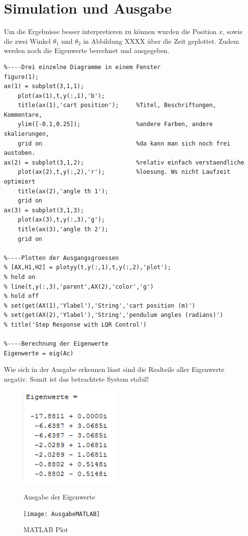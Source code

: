 \documentclass[a4paper, 10pt]{report}
\begin{document}
\section{Simulation und Ausgabe}
Um die Ergebnisse besser interpretieren zu können wurden die Position $x$, sowie die zwei Winkel $\theta_{1}$ und $\theta_{2}$ in Abbildung XXXX über die Zeit geplottet. Zudem werden noch die Eigenwerte berechnet und ausgegeben.  
\begin{lstlisting}
%----Drei einzelne Diagramme in einem Fenster
figure(1);
ax(1) = subplot(3,1,1);
    plot(ax(1),t,y(:,1),'b');
    title(ax(1),'cart position');     %Titel, Beschriftungen, Kommentare,
    ylim([-0.1,0.25]);                %andere Farben, andere skalierungen,
    grid on                           %da kann man sich noch frei austoben.
ax(2) = subplot(3,1,2);               %relativ einfach verstaendliche 
    plot(ax(2),t,y(:,2),'r');         %loesung. Ws nicht Laufzeit optimiert
    title(ax(2),'angle th 1');
    grid on
ax(3) = subplot(3,1,3);
    plot(ax(3),t,y(:,3),'g');
    title(ax(3),'angle th 2');
    grid on

%----Plotten der Ausgangsgroessen
% [AX,H1,H2] = plotyy(t,y(:,1),t,y(:,2),'plot');
% hold on
% line(t,y(:,3),'parent',AX(2),'color','g')
% hold off
% set(get(AX(1),'Ylabel'),'String','cart position (m)')
% set(get(AX(2),'Ylabel'),'String','pendulum angles (radians)')
% title('Step Response with LQR Control')

%----Berechnung der Eigenwerte
Eigenwerte = eig(Ac)
\end{lstlisting}
Wie sich in der Ausgabe erkennen lässt sind die Realteile aller Eigenwerte negativ. Somit ist das betrachtete System stabil!
\begin{figure}[h]
\centering  %
{\includegraphics[width=5cm]{Eigenwerte}}
\caption{Ausgabe der Eigenwerte}
\end{figure}

\begin{figure}[h]
\centering  %
{\texttt{[image: AusgabeMATLAB]}}
\caption{MATLAB Plot}
\end{figure}
\end{document}
